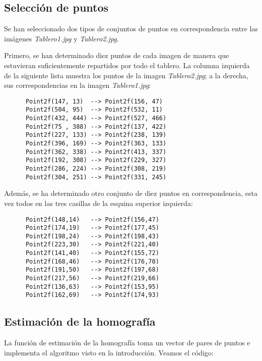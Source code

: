 \documentclass[a4paper, 11pt]{article}
\theoremstyle{definition}
\theoremstyle{theorem}
\begin{document}
  \subsection{Selección de puntos}
  Se han seleccionado dos tipos de conjuntos de puntos en correspondencia entre las imágenes \emph{Tablero1.jpg} y \emph{Tablero2.jpg}.

  Primero, se han determinado diez puntos de cada imagen de manera que estuvieran suficientemente repartidos por todo el tablero. La columna izquierda de la siguiente lista muestra los puntos de la imagen \emph{Tablero2.jpg}; a la derecha, sus correspondencias en la imagen \emph{Tablero1.jpg}:
  \begin{lstlisting}
      Point2f(147, 13)  --> Point2f(156, 47)
      Point2f(504, 95)  --> Point2f(532, 11)
      Point2f(432, 444) --> Point2f(527, 466)
      Point2f(75 , 388) --> Point2f(137, 422)
      Point2f(227, 133) --> Point2f(238, 139)
      Point2f(396, 169) --> Point2f(363, 133)
      Point2f(362, 338) --> Point2f(413, 337)
      Point2f(192, 308) --> Point2f(229, 327)
      Point2f(286, 224) --> Point2f(308, 219)
      Point2f(304, 251) --> Point2f(331, 245)
  \end{lstlisting}

  Además, se ha determinado otro conjunto de diez puntos en correspondencia, esta vez todos en las tres casillas de la esquina superior izquierda:
  \begin{lstlisting}
      Point2f(148,14)   --> Point2f(156,47)
      Point2f(174,19)   --> Point2f(177,45)
      Point2f(198,24)   --> Point2f(198,43)
      Point2f(223,30)   --> Point2f(221,40)
      Point2f(141,40)   --> Point2f(155,72)
      Point2f(168,46)   --> Point2f(176,70)
      Point2f(191,50)   --> Point2f(197,68)
      Point2f(217,56)   --> Point2f(219,66)
      Point2f(136,63)   --> Point2f(153,95)
      Point2f(162,69)   --> Point2f(174,93)
  \end{lstlisting}

  \subsection{Estimación de la homografía}
  La función de estimación de la homografía toma un vector de pares de puntos e implementa el algoritmo visto en la introducción. Veamos el código:
\end{document}
